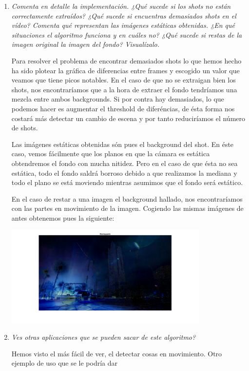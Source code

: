 \documentclass{article}
\begin{document}
\begin{enumerate}
\begin{enumerate}
 \item \textit{Comenta  en  detalle  la  implementación.  ¿Qué  sucede  si  los  shots  no  están 
correctamente  extraídos?    ¿Qué  sucede  si  encuentras  demasiados  shots  en  el 
vídeo?  Comenta qué representan  las  imágenes  estáticas  obtenidas.  ¿En  qué 
situaciones  el  algoritmo  funciona  y  en  cuáles  no? ¿Qué  sucede  si  restas  de  la 
imagen original la imagen del fondo? Visualízalo.}

Para resolver el problema de encontrar demasiados shots lo que hemos hecho ha sido plotear la gráfica de diferencias entre frames y escogido un valor que veamos que tiene picos notables. En el caso de que no se extraigan bien los shots, nos encontraríamos que a la hora de extraer el fondo tendríamos una mezcla entre ambos backgrounds. Si por contra hay demasiados, lo que podemos hacer es augmentar el threshold de diferéncias, de ésta forma nos costará más detectar un cambio de escena y por tanto reduciríamos el número de shots.

Las imágenes estáticas obtenidas són pues el background del shot. En éste caso, vemos fácilmente que los planos en que la cámara es estática obtendremos el fondo con mucha nitidez. Pero en el caso de que ésta no sea estática, todo el fondo saldrá borroso debido a que realizamos la mediana y todo el plano se está moviendo mientras asumimos que el fondo será estático.

En el caso de restar a una imagen el background hallado, nos encontraríamos con las partes en movimiento de la imagen. Cogiendo las mismas imágenes de antes obtenemos pues la siguiente:

\begin{center}
	\includegraphics[width=0.8\textwidth]{ej31b.png}
\end{center}

 \item \textit{Ves  otras aplicaciones que se pueden sacar de este algoritmo?}

Hemos visto el más fácil de ver, el detectar cosas en movimiento. Otro ejemplo de uso que se le podría dar 
 \end{enumerate}


\end{enumerate}
\end{document}

